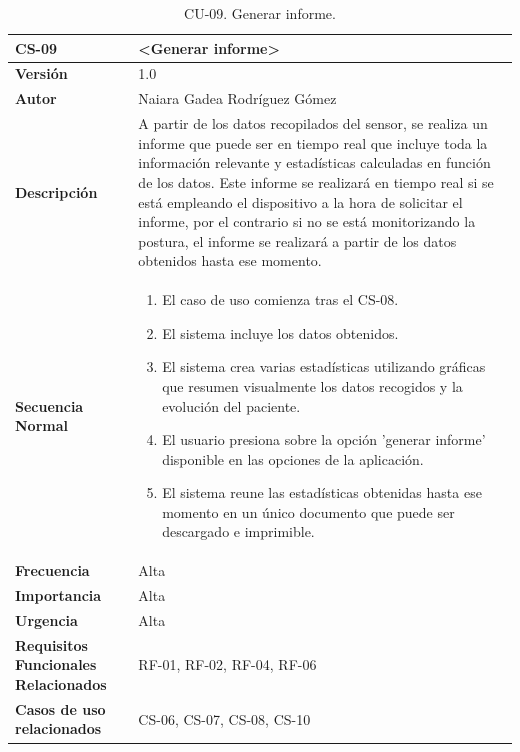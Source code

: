 
\begin{table}[h!]
\centering
\begin{tabular}{ |m{3cm}|m{11cm}|  } 
\hline
\cellcolor[HTML]{B9E3F0}\textbf{CS-09} & \cellcolor[HTML]{B9E3F0}\textbf{<Generar informe>}\\

\hline
\cellcolor[HTML]{EFEFEF}\textbf{Versión}             & 1.0  \\
\hline
\cellcolor[HTML]{EFEFEF}\textbf{Autor}                & Naiara Gadea Rodríguez Gómez\\
\hline
\cellcolor[HTML]{EFEFEF}\textbf{Descripción}                & {A partir de los datos recopilados del sensor, se realiza un informe que puede ser en tiempo real que incluye toda la información relevante y estadísticas calculadas en función de los datos. Este informe se realizará en tiempo real si se está empleando el dispositivo a la hora de solicitar el informe, por el contrario si no se está monitorizando la postura, el informe se realizará a partir de los datos obtenidos hasta ese momento.}\\
\hline
\cellcolor[HTML]{EFEFEF}\textbf{Secuencia \newline Normal}                &                 
        \begin{enumerate}
			\def\labelenumi{\arabic{enumi}.}
			\tightlist
			\item El caso de uso comienza tras el CS-08.
			\item El sistema incluye los datos obtenidos. 
                \item El sistema crea varias estadísticas utilizando gráficas que resumen visualmente los datos recogidos y la evolución del paciente.
                \item El usuario presiona sobre la opción 'generar informe' disponible en las opciones de la aplicación.
                \item El sistema reune las estadísticas obtenidas hasta ese momento en un único documento que puede ser descargado e imprimible.
                
		\end{enumerate}\\
\hline
\cellcolor[HTML]{EFEFEF}\textbf{Frecuencia}                & Alta\\
\hline
\cellcolor[HTML]{EFEFEF}\textbf{Importancia}                & Alta\\
\hline
\cellcolor[HTML]{EFEFEF}\textbf{Urgencia}                & Alta\\
\hline
\cellcolor[HTML]{EFEFEF}\textbf{Requisitos Funcionales Relacionados}                & {RF-01, RF-02, RF-04, RF-06 }\\
\hline
\cellcolor[HTML]{EFEFEF}\textbf{Casos de uso relacionados}                & {CS-06, CS-07, CS-08, CS-10 }\\
\hline
\end{tabular}
\caption{CU-09. Generar informe.}
\end{table}

